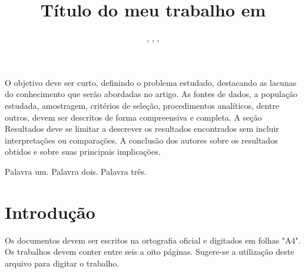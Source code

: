 \documentclass{modelo}
\newcommand{\resumotexto}  
{  
  
O objetivo deve ser curto, definindo o problema estudado, destacando as lacunas do conhecimento que serão abordadas no artigo.
As fontes de dados, a população estudada, amostragem, critérios de seleção, procedimentos analíticos, dentre outros, devem ser descritos de forma compreensiva e completa. A seção Resultados deve se limitar a descrever os resultados encontrados sem incluir interpretações ou comparações. A conclusão dos autores sobre os resultados obtidos e sobre suas principais implicações. 
}
\newcommand{\palavraschave}{Palavra um. Palavra dois. Palavra três.}
\begin{document}
 	
\title{Título do meu trabalho em \LaTeXe}
 
  	 
\author{  
 

,  
,  
,   

 
 

	  

			 
} 
  


\criartitulo  
\thispagestyle{plain}  
\pagestyle{plain}

\begin{resumo}
\resumotexto
\end{resumo}  
	
\begin{keywords} 
 \palavraschave
\end{keywords} 


 
 
 
\section{Introdução}  

Os documentos devem ser escritos na ortografia oficial e digitados em folhas "A4". Os trabalhos devem conter entre seis a oito páginas. Sugere-se a utilização deste arquivo para digitar o trabalho. 
\end{document}
